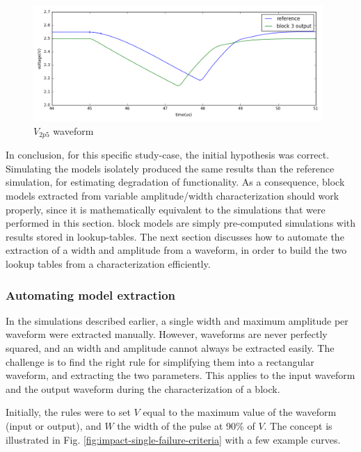 \begin{figure}[!h]
  \centering
  \includegraphics[width=0.98\textwidth]{src/4/figures/simulation_comparison_block3.png}
  \caption{$V_{2p5}$ waveform}
  \label{fig:sim-compare-block3}
\end{figure}

In conclusion, for this specific study-case, the initial hypothesis was correct.
Simulating the models isolately produced the same results than the reference simulation, for estimating degradation of functionality.
As a consequence, block models extracted from variable amplitude/width characterization should work properly, since it is mathematically equivalent to the simulations that were performed in this section.
block models are simply pre-computed simulations with results stored in \gls{lookup-table}s.
The next section discusses how to automate the extraction of a width and amplitude from a waveform, in order to build the two lookup tables from a characterization efficiently.

\subsubsection{Automating model extraction}

In the simulations described earlier, a single width and maximum amplitude per waveform were extracted manually.
However, waveforms are never perfectly squared, and an width and amplitude cannot always be extracted easily.
The challenge is to find the right rule for simplifying them into a rectangular waveform, and extracting the two parameters.
This applies to the input waveform and the output waveform during the characterization of a block.

Initially, the rules were to set $V$ equal to the maximum value of the waveform (input or output), and $W$ the width of the pulse at 90\% of $V$.
The concept is illustrated in Fig. \ref{fig:impact-single-failure-criteria} with a few example curves.

